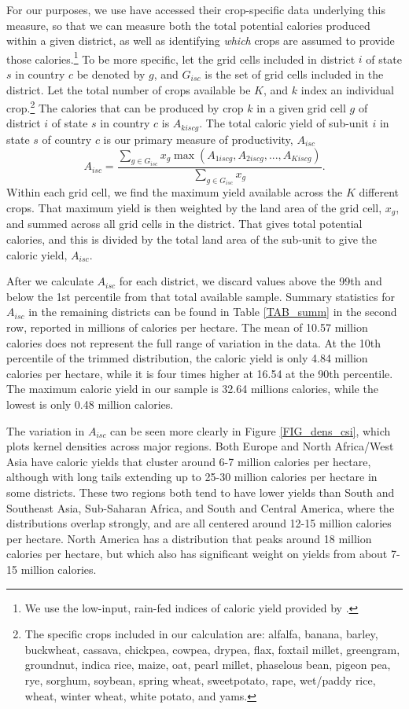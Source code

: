 \documentclass[11pt]{article}
\begin{document}
For our purposes, we use have accessed their crop-specific data underlying this measure, so that we can measure both the total potential calories produced within a given district, as well as identifying \textit{which} crops are assumed to provide those calories.\footnote{We use the low-input, rain-fed indices of caloric yield provided by \citet{galorozak2016}.} To be more specific, let the grid cells included in district $i$ of state $s$ in country $c$ be denoted by $g$, and $G_{isc}$ is the set of grid cells included in the district. Let the total number of crops available be $K$, and $k$ index an individual crop.\footnote{The specific crops included in our calculation are: alfalfa, banana, barley, buckwheat, cassava, chickpea, cowpea, drypea, flax, foxtail millet, greengram, groundnut, indica rice, maize, oat, pearl millet, phaselous bean, pigeon pea, rye, sorghum, soybean, spring wheat, sweetpotato, rape, wet/paddy rice, wheat, winter wheat, white potato, and yams.} The calories that can be produced by crop $k$ in a given grid cell $g$ of district $i$ of state $s$ in country $c$ is $A_{kiscg}$. The total caloric yield of sub-unit $i$ in state $s$ of country $c$ is our primary measure of productivity, $A_{isc}$
\begin{equation}
	A_{isc} = \frac{\sum_{g \in G_{isc}} x_g \max\left(A_{1iscg}, A_{2iscg}, ..., A_{Kiscg}\right)}{\sum_{g \in G_{isc}} x_g}.
\end{equation}
Within each grid cell, we find the maximum yield available across the $K$ different crops. That maximum yield is then weighted by the land area of the grid cell, $x_g$, and summed across all grid cells in the district. That gives total potential calories, and this is divided by the total land area of the sub-unit to give the caloric yield, $A_{isc}$.

After we calculate $A_{isc}$ for each district, we discard values above the 99th and below the 1st percentile from that total available sample. Summary statistics for $A_{isc}$ in the remaining districts can be found in Table \ref{TAB_summ} in the second row, reported in millions of calories per hectare. The mean of 10.57 million calories does not represent the full range of variation in the data. At the 10th percentile of the trimmed distribution, the caloric yield is only 4.84 million calories per hectare, while it is four times higher at 16.54 at the 90th percentile. The maximum caloric yield in our sample is 32.64 millions calories, while the lowest is only 0.48 million calories. 

The variation in $A_{isc}$ can be seen more clearly in Figure \ref{FIG_dens_csi}, which plots kernel densities across major regions. Both Europe and North Africa/West Asia have caloric yields that cluster around 6-7 million calories per hectare, although with long tails extending up to 25-30 million calories per hectare in some districts. These two regions both tend to have lower yields than South and Southeast Asia, Sub-Saharan Africa, and South and Central America, where the distributions overlap strongly, and are all centered around 12-15 million calories per hectare. North America has a distribution that peaks around 18 million calories per hectare, but which also has significant weight on yields from about 7-15 million calories. 
\end{document}
